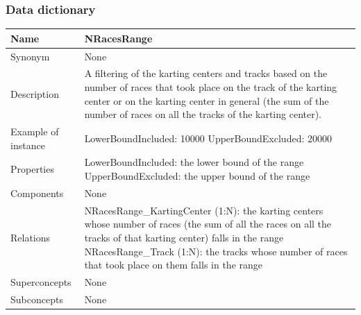 \documentclass{beamer}
\begin{document}
\begin{frame}
    \frametitle{Data dictionary}
    \begin{table}
    \tiny
    \begin{tabular}{|p{2cm}|p{6cm}|}
    \hline
    Name & \textbf{NRacesRange} \\
    \hline
    Synonym & None \\
    \hline
    Description & A filtering of the karting centers and tracks based on the number of
    races that took place on the track of the karting center or on the karting center 
    in general (the sum of the number of races on all the tracks of the karting center). \\
    \hline
    Example of instance &
    LowerBoundIncluded: 10000 \newline
    UpperBoundExcluded: 20000 \\
    \hline
    Properties &
    LowerBoundIncluded: the lower bound of the range \newline
    UpperBoundExcluded: the upper bound of the range \\
    \hline
    Components & None \\
    \hline
    Relations &
    NRacesRange\_KartingCenter (1:N): the karting centers whose number of races 
    (the sum of all the races on all the tracks of that karting center) falls in the range \newline
    NRacesRange\_Track (1:N): the tracks whose number of races that took place on them falls in the range \\
    \hline
    Superconcepts & None \\
    \hline
    Subconcepts & None \\
    \hline
    \end{tabular}
    \end{table}
\end{frame}
\end{document}
